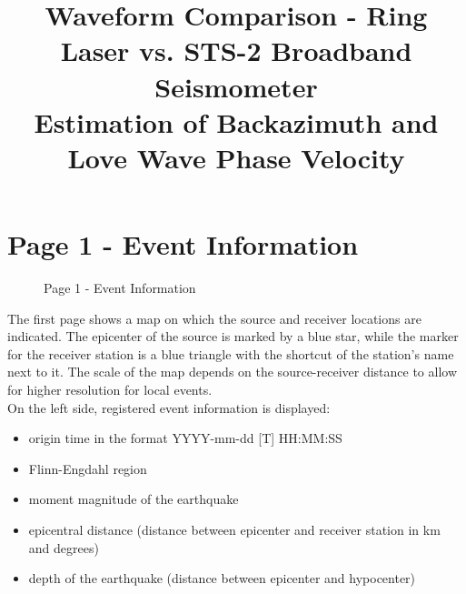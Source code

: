 \documentclass[a4paper,10pt]{article}
\begin{document}
\title{\textbf{Waveform Comparison - Ring Laser vs. STS-2 Broadband Seismometer}\\
Estimation of Backazimuth and Love Wave Phase Velocity}
\date{}
\maketitle

\section*{Page 1 - Event Information}

\begin{figure}[h!]
\centering
 \caption{Page 1 - Event Information}
 \label{page1}
\end{figure}

The  first  page  shows  a  map  on  which  the  source  and  receiver  locations  are  indicated.  The  epicenter  of  the source is marked by a blue star, while the marker for the receiver station is a blue triangle with the shortcut of  the  station's  name  next  to  it.  The  scale  of  the  map  depends  on  the  source-receiver  distance  to  allow  for higher resolution for local events.\\
On the left side, registered event information is displayed:

\begin{itemize}
	\item origin time in the format YYYY-mm-dd [T] HH:MM:SS
	\item Flinn-Engdahl region
	\item moment magnitude of the earthquake
	\item epicentral distance (distance between epicenter and receiver station in km and degrees)
	\item depth of the earthquake (distance between epicenter and hypocenter)
\end{itemize}
\end{document}
